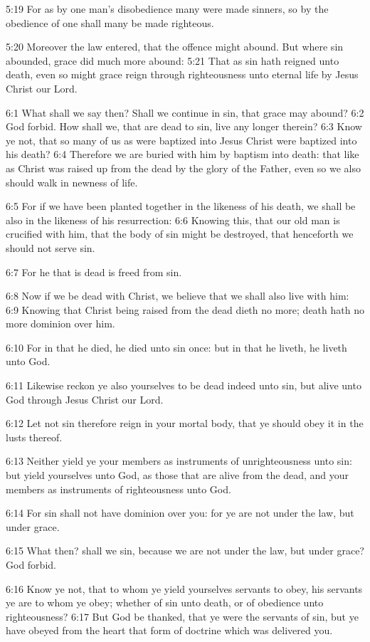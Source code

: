 5:19 For as by one man's disobedience many were made sinners, so by
the obedience of one shall many be made righteous.

5:20 Moreover the law entered, that the offence might abound. But
where sin abounded, grace did much more abound: 5:21 That as sin hath
reigned unto death, even so might grace reign through righteousness
unto eternal life by Jesus Christ our Lord.

6:1 What shall we say then? Shall we continue in sin, that grace may
abound?  6:2 God forbid. How shall we, that are dead to sin, live any
longer therein?  6:3 Know ye not, that so many of us as were baptized
into Jesus Christ were baptized into his death?  6:4 Therefore we are
buried with him by baptism into death: that like as Christ was raised
up from the dead by the glory of the Father, even so we also should
walk in newness of life.

6:5 For if we have been planted together in the likeness of his death,
we shall be also in the likeness of his resurrection: 6:6 Knowing
this, that our old man is crucified with him, that the body of sin
might be destroyed, that henceforth we should not serve sin.

6:7 For he that is dead is freed from sin.

6:8 Now if we be dead with Christ, we believe that we shall also live
with him: 6:9 Knowing that Christ being raised from the dead dieth no
more; death hath no more dominion over him.

6:10 For in that he died, he died unto sin once: but in that he
liveth, he liveth unto God.

6:11 Likewise reckon ye also yourselves to be dead indeed unto sin,
but alive unto God through Jesus Christ our Lord.

6:12 Let not sin therefore reign in your mortal body, that ye should
obey it in the lusts thereof.

6:13 Neither yield ye your members as instruments of unrighteousness
unto sin: but yield yourselves unto God, as those that are alive from
the dead, and your members as instruments of righteousness unto God.

6:14 For sin shall not have dominion over you: for ye are not under
the law, but under grace.

6:15 What then? shall we sin, because we are not under the law, but
under grace? God forbid.

6:16 Know ye not, that to whom ye yield yourselves servants to obey,
his servants ye are to whom ye obey; whether of sin unto death, or of
obedience unto righteousness?  6:17 But God be thanked, that ye were
the servants of sin, but ye have obeyed from the heart that form of
doctrine which was delivered you.

